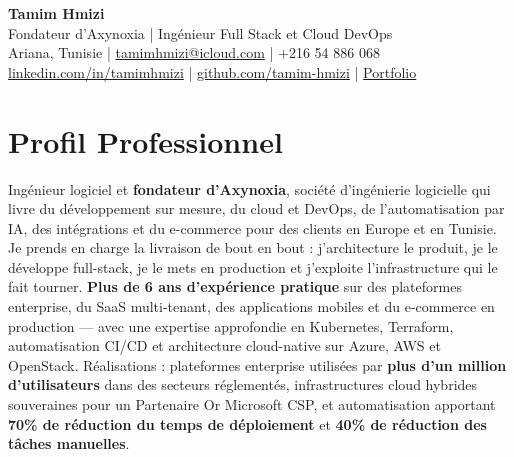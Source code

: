 \documentclass[10pt, letterpaper]{article}
\begin{document}
{\fontsize{22}{22}\selectfont \textbf{Tamim Hmizi}} \\[4pt]
{\large Fondateur d'Axynoxia \;|\; Ingénieur Full Stack et Cloud DevOps} \\[6pt]
Ariana, Tunisie \;|\;
\href{mailto:tamimhmizi@icloud.com}{tamimhmizi@icloud.com} \;|\;
+216 54 886 068 \\
\href{https://linkedin.com/in/tamimhmizi}{linkedin.com/in/tamimhmizi} \;|\;
\href{https://github.com/tamim-hmizi}{github.com/tamim-hmizi} \;|\;
\href{https://tamim-hmizi.github.io/Portfolio/}{Portfolio}

\vspace{0.4cm}

\section{Profil Professionnel}
Ingénieur logiciel et \textbf{fondateur d'Axynoxia}, société d'ingénierie logicielle qui livre du développement sur mesure, du cloud et DevOps, de l'automatisation par IA, des intégrations et du e-commerce pour des clients en Europe et en Tunisie.
Je prends en charge la livraison de bout en bout : j'architecture le produit, je le développe full-stack, je le mets en production et j'exploite l'infrastructure qui le fait tourner.
\textbf{Plus de 6 ans d'expérience pratique} sur des plateformes enterprise, du SaaS multi-tenant, des applications mobiles et du e-commerce en production --- avec une expertise approfondie en Kubernetes, Terraform, automatisation CI/CD et architecture cloud-native sur Azure, AWS et OpenStack.
Réalisations : plateformes enterprise utilisées par \textbf{plus d'un million d'utilisateurs} dans des secteurs réglementés, infrastructures cloud hybrides souveraines pour un Partenaire Or Microsoft CSP, et automatisation apportant \textbf{70\% de réduction du temps de déploiement} et \textbf{40\% de réduction des tâches manuelles}.

\end{document}
